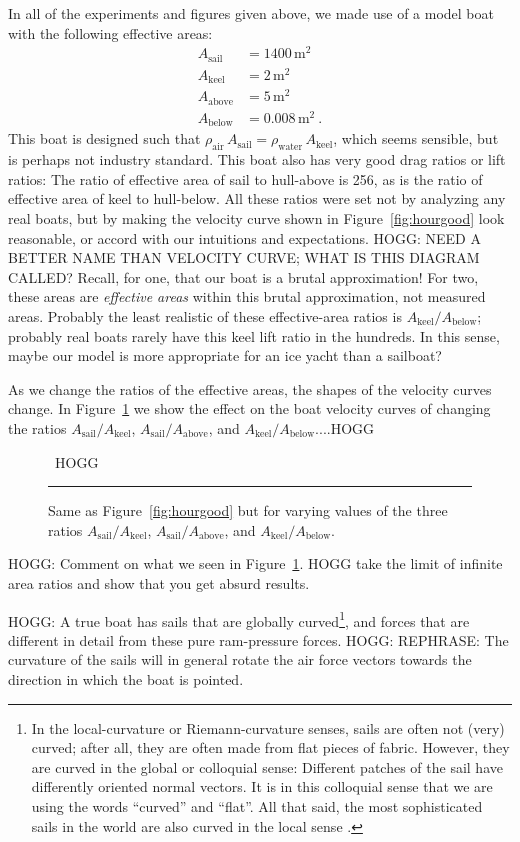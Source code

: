 \documentclass[letterpaper]{article}
\newcommand{\air}{\text{air}}
\newcommand{\water}{\text{water}}
\newcommand{\sail}{\text{sail}}
\newcommand{\keel}{\text{keel}}
\renewcommand{\above}{\text{above}}
\newcommand{\below}{\text{below}}
\newcommand{\mm}{\mathrm{m^2}}
\newcommand{\figref}[1]{Figure~\ref{#1}}
\newcommand{\figurerule}{\rule[1ex]{\textwidth}{0.2pt}}
\begin{document}
In all of the experiments and figures given above, we made use of a model boat with the following effective areas:
\begin{align}
  A_\sail &= 1400\,\mm \\
  A_\keel &= 2\,\mm \\
  A_\above &= 5\,\mm \\
  A_\below &= 0.008\,\mm ~.
\end{align}
This boat is designed such that $\rho_\air\,A_\sail = \rho_\water\,A_\keel$, which seems sensible, but is perhaps not industry standard.
This boat also has very good drag ratios or lift ratios:
The ratio of effective area of sail to hull-above is 256, as is the ratio of effective area of keel to hull-below.
All these ratios were set not by analyzing any real boats, but by making the velocity curve shown in \figref{fig:hourgood} look reasonable, or accord with our intuitions and expectations.
HOGG: NEED A BETTER NAME THAN VELOCITY CURVE; WHAT IS THIS DIAGRAM CALLED?
Recall, for one, that our boat is a brutal approximation!
For two, these areas are \emph{effective areas} within this brutal approximation, not measured areas.
Probably the least realistic of these effective-area ratios is $A_\keel/A_\below$; probably real boats rarely have this keel lift ratio in the hundreds.
In this sense, maybe our model is more appropriate for an ice yacht than a sailboat?

As we change the ratios of the effective areas, the shapes of the velocity curves change.
In \figref{fig:design} we show the effect on the boat velocity curves of changing the ratios $A_\sail/A_\keel$, $A_\sail/A_\above$, and $A_\keel/A_\below$....HOGG
\begin{figure}[t!]
  ~\hfill HOGG \hfill~
  \caption{Same as \figref{fig:hourgood} but for varying values of the three ratios $A_\sail/A_\keel$, $A_\sail/A_\above$, and $A_\keel/A_\below$.\label{fig:design}}
  \figurerule
\end{figure}

HOGG: Comment on what we seen in \figref{fig:design}.
HOGG take the limit of infinite area ratios and show that you get absurd results.

HOGG: 
A true boat has sails that are globally curved\footnote{%
In the local-curvature or Riemann-curvature senses, sails are often not (very) curved; after all, they are often made from flat pieces of fabric.
However, they are curved in the global or colloquial sense: Different patches of the sail have differently oriented normal vectors.
It is in this colloquial sense that we are using the words ``curved'' and ``flat''.
All that said, the most sophisticated sails in the world are also curved in the local sense \cite{sails}.},
and forces that are different in detail from these pure ram-pressure forces.
HOGG: REPHRASE: The curvature of the sails will in general rotate the air force vectors towards the direction in which the boat is pointed.
\end{document}
